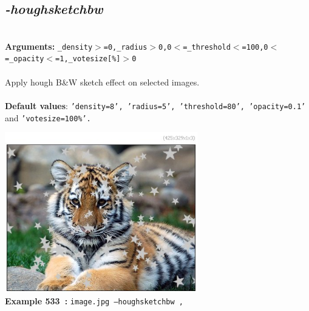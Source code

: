 \documentclass[a4paper,11pt,twoside]{book}
\begin{document}
\subsection{\emph{-houghsketchbw} }\vspace*{-0.5em}
~\\\textbf{Arguments: } 
{\small \texttt{\_density$>$=0,\_radius$>$0,0$<$=\_threshold$<$=100,0$<$=\_opacity$<$=1,\_votesize[\%]$>$0}}\\~\\
Apply hough B\&W sketch effect on selected images.
~\\~\\\textbf{Default values}: {\small \texttt{'density=8', 'radius=5', 'threshold=80', 'opacity=0.1'} and \texttt{'votesize=100\%'.}}
\begin{center}\includegraphics[keepaspectratio=true,height=7cm,width=\textwidth]{img/gmic_def533.jpg}\\
{\footnotesize \textbf{Example 533~:} \texttt{image.jpg --houghsketchbw ,}}
\end{center}
\end{document}
